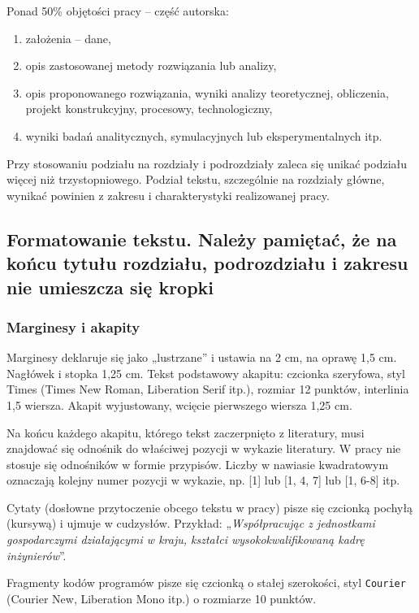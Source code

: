 \documentclass[12pt,twoside]{article}
\begin{document}
Ponad 50\% objętości pracy -- część autorska:
\begin{enumerate}[label=\alph*), leftmargin=1.25cm] 
	\item założenia – dane,
	\item opis zastosowanej metody rozwiązania lub analizy,
	\item opis proponowanego rozwiązania, wyniki analizy teoretycznej, obliczenia, projekt konstrukcyjny, procesowy, technologiczny,
	\item wyniki badań analitycznych, symulacyjnych lub eksperymentalnych itp.
\end{enumerate}

Przy stosowaniu podziału na rozdziały i podrozdziały zaleca się unikać podziału więcej niż trzystopniowego. Podział tekstu, szczególnie na rozdziały główne, wynikać powinien z zakresu i charakterystyki realizowanej pracy.

\subsection{Formatowanie tekstu. Należy pamiętać, że na końcu tytułu rozdziału, podrozdziału i zakresu nie umieszcza się kropki}

\subsubsection{Marginesy i akapity}

Marginesy deklaruje się jako „lustrzane” i ustawia na 2 cm, na oprawę 1,5 cm. 
Nagłówek i stopka 1,25 cm. Tekst podstawowy akapitu: czcionka szeryfowa, styl Times (Times New Roman, Liberation Serif itp.), rozmiar 12 punktów, interlinia 1,5 wiersza. Akapit wyjustowany, wcięcie pierwszego wiersza 1,25 cm. 

Na końcu każdego akapitu, którego tekst zaczerpnięto z literatury, musi znajdować się odnośnik do właściwej pozycji w wykazie literatury. W pracy nie stosuje się
odnośników w formie przypisów. Liczby w nawiasie kwadratowym oznaczają kolejny numer pozycji w wykazie, np. [1] lub [1, 4, 7] lub [1, 6-8] itp.

Cytaty (dosłowne przytoczenie obcego tekstu w pracy) pisze się czcionką pochyłą (kursywą) i ujmuje w cudzysłów. Przykład: „\textit{Współpracując z jednostkami gospodarczymi działającymi w kraju, kształci wysokokwalifikowaną kadrę inżynierów}”.

Fragmenty kodów programów pisze się czcionką o stałej szerokości, styl \footnotesize {\texttt{Courier}}
\normalsize{(Courier New, Liberation Mono itp.) o rozmiarze 10 punktów.}
\end{document}
